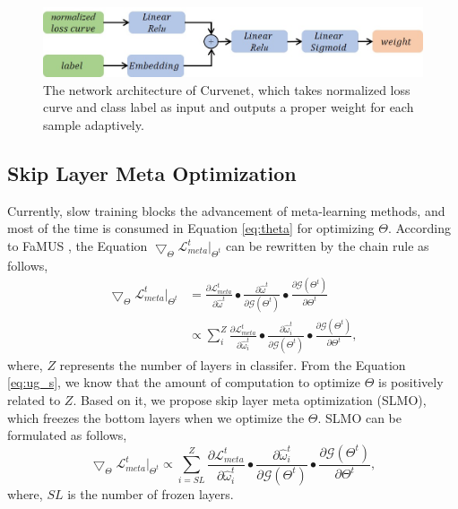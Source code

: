 \documentclass[letterpaper]{article} %
\begin{document}
\begin{figure}[t]
\begin{center}
   \includegraphics[width=1.0\linewidth]{figs/sensinet.jpg}
\end{center}
\vspace{-0.30cm} 
   \caption{The network architecture of Curvenet, which takes normalized loss curve and class label as input and outputs a proper weight for each sample adaptively.
   }
\label{fig:CurveNet}
\vspace{-0.70cm} 
\end{figure}

\subsection{Skip Layer Meta Optimization}
Currently, slow training blocks the advancement of meta-learning methods, and most of the time is consumed in Equation \ref{eq:theta} for optimizing $\Theta$.
According to FaMUS \cite{Xu2021FaMUS}, the Equation $\bigtriangledown_\Theta \mathcal{L}^{t}_{meta}|_{\Theta^{t}}$ can be rewritten by the chain rule as follows, 
\begin{equation}
\begin{split}
     \bigtriangledown_\Theta \mathcal{L}^{t}_{meta}|_{\Theta^{t}}  & = \frac{\partial \mathcal{L}^{t}_{meta} }{\partial \hat{\omega}^t} \bullet \frac{\partial \hat{\omega}^t}{\partial \mathcal{G}(\Theta^{t})} \bullet \frac{\partial \mathcal{G}(\Theta^{t})}{\partial \Theta^{t}} \\
     & \varpropto \sum_i^Z \frac{\partial \mathcal{L}^{t}_{meta} }{\partial \hat{\omega}^t_i} \bullet \frac{\partial \hat{\omega}^t_i}{\partial \mathcal{G}(\Theta^{t})} \bullet \frac{\partial \mathcal{G}(\Theta^{t})}{\partial \Theta^{t}},
\end{split}
    \label{eq:ug_s}
\end{equation}
where, $Z$ represents the number of layers in classifer.
From the Equation \ref{eq:ug_s}, we know that the amount of computation to optimize $\Theta$ is positively related to $Z$.
Based on it, we propose skip layer meta optimization (SLMO), which freezes the bottom layers when we optimize the $\Theta$.  
SLMO can be formulated as follows,
\begin{equation}
     \bigtriangledown_\Theta \mathcal{L}^{t}_{meta}|_{\Theta^{t}}   \varpropto \sum_{i=SL}^Z \frac{\partial \mathcal{L}^{t}_{meta} }{\partial \hat{\omega}^t_i} \bullet \frac{\partial \hat{\omega}^t_i}{\partial \mathcal{G}(\Theta^{t})} \bullet \frac{\partial \mathcal{G}(\Theta^{t})}{\partial \Theta^{t}},
    \label{eq:ug_sK}
\end{equation}
where, $SL$ is the number of frozen layers.
\end{document}
